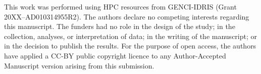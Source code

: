 \documentclass{article}
\begin{document}
\acksection
This work was performed using HPC resources from GENCI-IDRIS (Grant 20XX--AD010314955R2). The authors declare no competing interests regarding this manuscript. The funders had no role in the design of the study; in the collection, analyses, or interpretation of data; in the writing of the manuscript; or in the decision to publish the results. For the purpose of open access, the authors have applied a CC-BY public copyright licence to any Author-Accepted Manuscript version arising from this submission.


\end{document}
